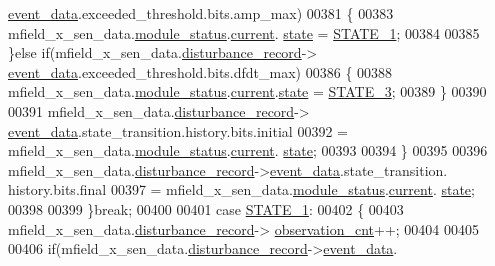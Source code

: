 \begin{DoxyCode}
      \hyperlink{a00028_a8c0bda69e71ef674e60da47ad0be9ab0}{event\_data}.exceeded\_threshold.bits.amp\_max)
00381              \{
00383                 mfield\_x\_sen\_data.\hyperlink{a00025_adfab5a5d8b45a93dfb13edb24e2b80e3}{module\_status}.\hyperlink{a00019_acf41ffc11da291c2f9f0fcb02ee72b98}{current}.
      \hyperlink{a00019_a6b8d8e916bc56265a3fd279bd26b6d1b}{state} = \hyperlink{a00021_a727351838367f27ac0adb9a13422c342}{STATE\_1};
00384 
00385              \}\textcolor{keywordflow}{else} \textcolor{keywordflow}{if}(mfield\_x\_sen\_data.\hyperlink{a00025_ac9b38e2c1d3f1013a88d33506c754152}{disturbance\_record}->
      \hyperlink{a00028_a8c0bda69e71ef674e60da47ad0be9ab0}{event\_data}.exceeded\_threshold.bits.dfdt\_max)
00386              \{
00388                mfield\_x\_sen\_data.\hyperlink{a00025_adfab5a5d8b45a93dfb13edb24e2b80e3}{module\_status}.\hyperlink{a00019_acf41ffc11da291c2f9f0fcb02ee72b98}{current}.\hyperlink{a00019_a6b8d8e916bc56265a3fd279bd26b6d1b}{state} = 
      \hyperlink{a00021_ad87f1bc8466a25d9f7da68717d324a22}{STATE\_3};
00389              \}
00390 
00391                  mfield\_x\_sen\_data.\hyperlink{a00025_ac9b38e2c1d3f1013a88d33506c754152}{disturbance\_record}->
      \hyperlink{a00028_a8c0bda69e71ef674e60da47ad0be9ab0}{event\_data}.state\_transition.history.bits.initial
00392                 = mfield\_x\_sen\_data.\hyperlink{a00025_adfab5a5d8b45a93dfb13edb24e2b80e3}{module\_status}.\hyperlink{a00019_acf41ffc11da291c2f9f0fcb02ee72b98}{current}.
      \hyperlink{a00019_a6b8d8e916bc56265a3fd279bd26b6d1b}{state};
00393 
00394             \}
00395 
00396              mfield\_x\_sen\_data.\hyperlink{a00025_ac9b38e2c1d3f1013a88d33506c754152}{disturbance\_record}->\hyperlink{a00028_a8c0bda69e71ef674e60da47ad0be9ab0}{event\_data}.state\_transition.
      history.bits.final
00397                 = mfield\_x\_sen\_data.\hyperlink{a00025_adfab5a5d8b45a93dfb13edb24e2b80e3}{module\_status}.\hyperlink{a00019_acf41ffc11da291c2f9f0fcb02ee72b98}{current}.
      \hyperlink{a00019_a6b8d8e916bc56265a3fd279bd26b6d1b}{state};
00398 
00399         \}\textcolor{keywordflow}{break};
00400 
00401          \textcolor{keywordflow}{case} \hyperlink{a00021_a727351838367f27ac0adb9a13422c342}{STATE\_1}:
00402         \{
00403             mfield\_x\_sen\_data.\hyperlink{a00025_ac9b38e2c1d3f1013a88d33506c754152}{disturbance\_record}->
      \hyperlink{a00028_ad5b0bac02ce266b91b2b52a1c3ea1d78}{observation\_cnt}++;
00404 
00405 
00406            \textcolor{keywordflow}{if}(mfield\_x\_sen\_data.\hyperlink{a00025_ac9b38e2c1d3f1013a88d33506c754152}{disturbance\_record}->\hyperlink{a00028_a8c0bda69e71ef674e60da47ad0be9ab0}{event\_data}.

\end{DoxyCode}
